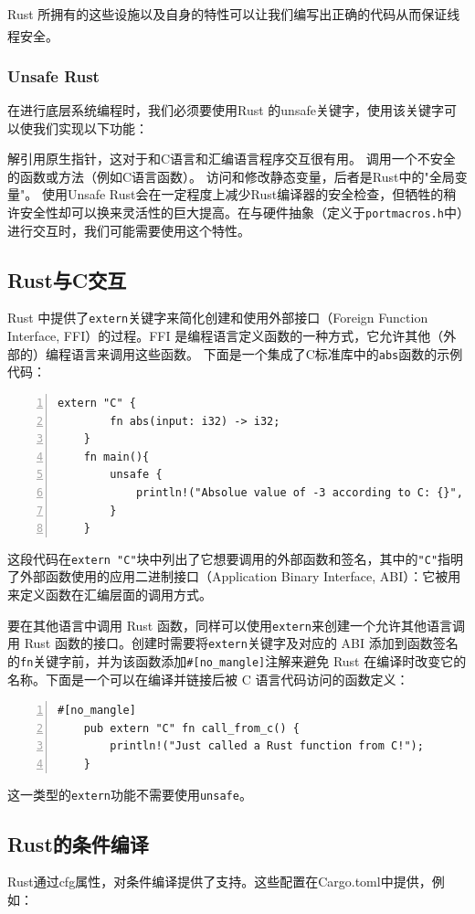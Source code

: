\documentclass[UTF8,fontset=none,linespread=1.15]{ctexart}
\let\nosupcite\cite
\renewcommand*{\cite}[1]{\textsuperscript{\nosupcite{#1}}}
\begin{document}
Rust 所拥有的这些设施以及自身的特性可以让我们编写出正确的代码从而保证线程安全。\cite{9}

\subsubsection{Unsafe Rust}
在进行底层系统编程时，我们必须要使用Rust 的unsafe关键字，使用该关键字可以使我们实现以下功能：

解引用原生指针，这对于和C语言和汇编语言程序交互很有用。
调用一个不安全的函数或方法（例如C语言函数）。
访问和修改静态变量，后者是Rust中的"全局变量"。
使用Unsafe Rust会在一定程度上减少Rust编译器的安全检查，但牺牲的稍许安全性却可以换来灵活性的巨大提高。在与硬件抽象（定义于\texttt{portmacros.h}中）进行交互时，我们可能需要使用这个特性。

\subsection{Rust与C交互}
Rust 中提供了\texttt{extern}关键字来简化创建和使用外部接口（Foreign Function Interface, FFI）的过程。FFI 是编程语言定义函数的一种方式，它允许其他（外部的）编程语言来调用这些函数。
下面是一个集成了C标准库中的\texttt{abs}函数的示例代码：
\begin{lstlisting}[numbers=left]
	extern "C" {
		fn abs(input: i32) -> i32;
	}
	fn main(){
		unsafe {
			println!("Absolue value of -3 according to C: {}", abs(-3));
		}
	}
\end{lstlisting}
这段代码在\texttt{extern "C"}块中列出了它想要调用的外部函数和签名，其中的\texttt{"C"}指明了外部函数使用的应用二进制接口（Application Binary Interface, ABI）：它被用来定义函数在汇编层面的调用方式。

要在其他语言中调用 Rust 函数，同样可以使用\texttt{extern}来创建一个允许其他语言调用 Rust 函数的接口。创建时需要将\texttt{extern}关键字及对应的 ABI 添加到函数签名的\texttt{fn}关键字前，并为该函数添加\texttt{\#[no\_mangle]}注解来避免 Rust 在编译时改变它的名称。下面是一个可以在编译并链接后被 C 语言代码访问的函数定义：
\begin{lstlisting}[numbers=left]
	#[no_mangle]
	pub extern "C" fn call_from_c() {
		println!("Just called a Rust function from C!");
	}
\end{lstlisting}
这一类型的\texttt{extern}功能不需要使用\texttt{unsafe}。

\subsection{Rust的条件编译}
Rust通过cfg属性，对条件编译提供了支持。这些配置在Cargo.toml中提供，例如：
\end{document}

